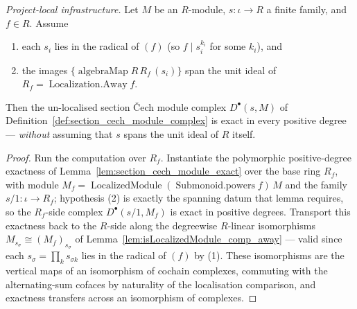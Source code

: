 \begin{lemma}
  \label{lem:section_cech_module_exact_of_localizationAway}
  \textit{Project-local infrastructure.}
  Let \(M\) be an \(R\)-module, \(s : \iota \to R\) a finite family, and \(f \in R\). Assume
  \begin{enumerate}
  \item each \(s_i\) lies in the radical of \((f)\) (so \(f \mid s_i^{k_i}\) for some \(k_i\)), and
  \item the images \(\{\operatorname{algebraMap} R\, R_f\, (s_i)\}\) span the unit ideal of
    \(R_f = \operatorname{Localization.Away} f\).
  \end{enumerate}
  Then the un-localised section {\v C}ech module complex \(D^\bullet(s, M)\) of
  Definition~\ref{def:section_cech_module_complex} is exact in every positive degree --- \emph{without}
  assuming that \(s\) spans the unit ideal of \(R\) itself.
\end{lemma}
\begin{proof}
  \leanok
  Run the computation over \(R_f\). Instantiate the polymorphic positive-degree exactness of
  Lemma~\ref{lem:section_cech_module_exact} over the base ring \(R_f\), with module
  \(M_f = \operatorname{LocalizedModule}(\operatorname{Submonoid.powers} f)\, M\) and the family
  \(s/1 : \iota \to R_f\); hypothesis (2) is exactly the spanning datum that lemma requires, so the
  \(R_f\)-side complex \(D^\bullet(s/1, M_f)\) is exact in positive degrees. Transport this exactness
  back to the \(R\)-side along the degreewise \(R\)-linear isomorphisms
  \(M_{s_\sigma} \cong (M_f)_{s_\sigma}\) of Lemma~\ref{lem:isLocalizedModule_comp_away} --- valid since
  each \(s_\sigma = \prod_k s_{\sigma k}\) lies in the radical of \((f)\) by (1). These isomorphisms are
  the vertical maps of an isomorphism of cochain complexes, commuting with the alternating-sum cofaces
  by naturality of the localisation comparison, and exactness transfers across an isomorphism of
  complexes.
\end{proof}

